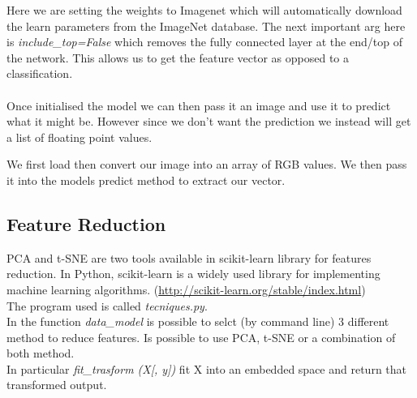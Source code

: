 \documentclass[12pt]{article} %
\begin{document}
Here we are setting the weights to Imagenet which will automatically download the learn parameters from the ImageNet database. The next important arg here is \textit{ include\_top=False} which removes the fully connected layer at the end/top of the network. This allows us to get the feature vector as opposed to a classification.\\
\\
Once initialised the model we can then pass it an image and use it to predict what it might be. However since we don’t want the prediction we instead will get a list of floating point values.

\begin{figure}[H] %
 \end{figure}

We first load then convert our image into an array of RGB values. We then pass it into the models predict method to extract our vector.\\

\subsection {Feature Reduction}
 PCA and t-SNE  are two tools available in scikit-learn library for features reduction. In Python, scikit-learn is a widely used library for implementing machine learning algorithms. (\url{http://scikit-learn.org/stable/index.html})\\
The program used is called \textit{tecniques.py}.\\
In the function \textit{data\_model} is possible to selct (by command line) 3 different method to reduce features. Is possible to use PCA, t-SNE or a combination of both method.\\
In particular \textit{fit\_trasform (X[, y])} fit X into an embedded space and return that transformed output. 
\end{document}
